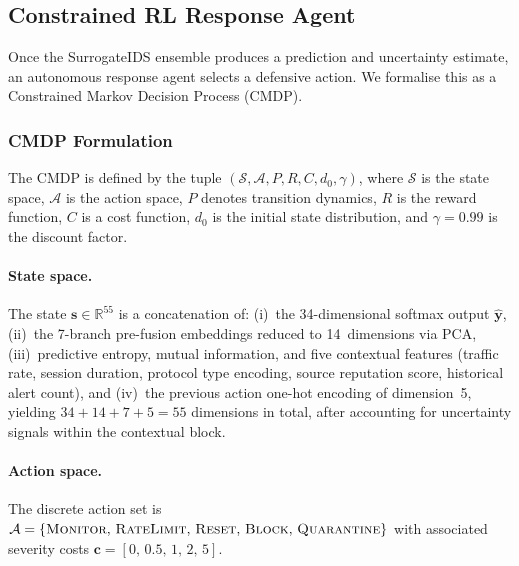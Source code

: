 \documentclass[journal,twoside]{IEEEtran}
\begin{document}
\subsection{Constrained RL Response Agent}
\label{sec:cpo}

Once the SurrogateIDS ensemble produces a prediction and uncertainty
estimate, an autonomous response agent selects a defensive action.  We
formalise this as a Constrained Markov Decision Process (CMDP).

\subsubsection{CMDP Formulation}
The CMDP is defined by the tuple
$(\mathcal{S},\mathcal{A},P,R,C,d_0,\gamma)$, where $\mathcal{S}$ is
the state space, $\mathcal{A}$ is the action space, $P$ denotes
transition dynamics, $R$ is the reward function, $C$ is a cost function,
$d_0$ is the initial state distribution, and $\gamma=0.99$ is the
discount factor.

\paragraph{State space.}
The state $\mathbf{s}\in\mathbb{R}^{55}$ is a concatenation of: (i)~the
34-dimensional softmax output $\hat{\mathbf{y}}$, (ii)~the 7-branch
pre-fusion embeddings reduced to 14~dimensions via PCA, (iii)~predictive
entropy, mutual information, and five contextual features (traffic rate,
session duration, protocol type encoding, source reputation score,
historical alert count), and (iv)~the previous action one-hot encoding
of dimension~5, yielding $34+14+7+5=55$ dimensions in total, after accounting for uncertainty signals within the contextual block.

\paragraph{Action space.}
The discrete action set is
$\mathcal{A}=\{\textsc{Monitor},\,\textsc{RateLimit},\,
\textsc{Reset},\,\textsc{Block},\,\textsc{Quarantine}\}$
with associated severity costs
$\mathbf{c}=[0,\,0.5,\,1,\,2,\,5]$.
\end{document}

